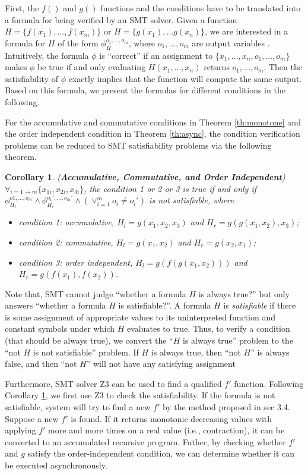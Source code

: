 First, the $f()$ and $g()$ functions and the conditions have to be translated into a formula for being verified by an SMT solver. Given a function $H=\{f(x_1),\ldots,f(x_m)\}$ or $H=\{g(x_1),...g(x_n)\}$, we are interested in a formula for $H$ of the form $\phi_H^{o_1,\ldots,o_m}$, where $o_1,\ldots,o_m$ are output variables \cite{Liu:2014:ADP:2670979.2670980}. Intuitively, the formula $\phi$ is ``correct'' if an assignment to $\{x_1,\ldots,x_n,o_1,\ldots,o_m\}$ makes $\phi$ be true if and only evaluating $H(x_1,\ldots,x_n)$ returns $o_1,\ldots,o_m$. Then the satisfiability of $\phi$ exactly implies that the function will compute the same output. Based on this formula, we present the formulas for different conditions in the following.

For the accumulative and commutative conditions in Theorem \ref{th:monotone} and the order independent condition in Theorem \ref{th:async}, the condition verification problems can be reduced to SMT satisfiability problems via the following theorem.

\newtheorem{corollary}{Corollary}
\begin{corollary}
	\label{coro:auto:1}
	(\textbf{Accumulative, Commutative, and Order Independent}) $\forall_{i=1\to m} \{x_{1i},x_{2i},x_{3i}\}$, the condition 1 or 2 or 3 is true if and only if $\phi_{H_l}^{o1,\ldots,o_m}\wedge \phi_{H_r}^{o_1',\ldots,o_m'}\wedge (\vee_{i=1}^m{o_i\neq o_i'})$ is not satisfiable, where
	\begin{itemize}
		\item condition 1: accumulative, $H_l=g(x_1,x_2,x_3)$ and $H_r=g(g(x_1,x_2),x_3)$;
		\item condition 2: commutative, $H_l=g(x_1,x_2)$ and $H_r=g(x_2,x_1)$;
		\item condition 3: order independent, $H_l=g(f(g(x_1,x_2)))$ and $H_r=g(f(x_1),f(x_2))$.
	\end{itemize}
\end{corollary}

Note that, SMT cannot judge ``whether a formula $H$ is always true?'' but only answers ``whether a formula $H$ is satisfiable?''. A formula $H$ is \emph{satisfiable} if there is some assignment of appropriate values to its uninterpreted function and constant symbols under which $H$ evaluates to true. Thus, to verify a condition (that should be always true), we convert the ``$H$ is always true'' problem to the ``not $H$ is not satisfiable'' problem. If $H$ is always true, then ``not $H$'' is always false, and then ``not $H$'' will not have any satisfying assignment


Furthermore, SMT solver Z3 can be used to find a qualified $f'$ function. Following Corollary \ref{coro:auto:1}, we first use Z3 to check the satisfiability.
If the formula is not satisfiable, system will try to find a new $f'$ by the method proposed in sec 3.4. Suppose a new $f'$ is found. If it returns monotonic decreasing values with applying $f'$ more and more times on a real value (i.e., contraction), it can be converted to an accumulated recursive program. Futher, by checking whether $f'$ and $g$ satisfy the order-independent condition, we can determine whether it can be executed asynchronously.
